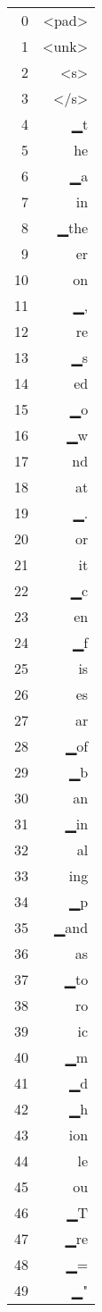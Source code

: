 \documentclass{standalone}
\begin{document}
\begin{tabular}{rr}
0 & <pad> \\
1 & <unk> \\
2 & <s> \\
3 & </s> \\
4 & ▁t \\
5 & he \\
6 & ▁a \\
7 & in \\
8 & ▁the \\
9 & er \\
10 & on \\
11 & ▁, \\
12 & re \\
13 & ▁s \\
14 & ed \\
15 & ▁o \\
16 & ▁w \\
17 & nd \\
18 & at \\
19 & ▁. \\
20 & or \\
21 & it \\
22 & ▁c \\
23 & en \\
24 & ▁f \\
25 & is \\
26 & es \\
27 & ar \\
28 & ▁of \\
29 & ▁b \\
30 & an \\
31 & ▁in \\
32 & al \\
33 & ing \\
34 & ▁p \\
35 & ▁and \\
36 & as \\
37 & ▁to \\
38 & ro \\
39 & ic \\
40 & ▁m \\
41 & ▁d \\
42 & ▁h \\
43 & ion \\
44 & le \\
45 & ou \\
46 & ▁T \\
47 & ▁re \\
48 & ▁= \\
49 & ▁"
\end{tabular}\par\bigskip
\end{document}
